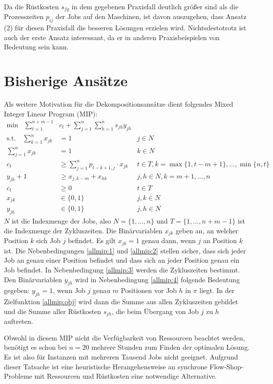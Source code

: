 \documentclass{scrreprt}
\begin{document}
Da die Rüstkosten $s_{fg}$ in dem gegebenen Praxisfall deutlich größer sind als die Prozesszeiten $p_{ij}$ der Jobs auf den Maschinen,
ist davon auszugehen, dass Ansatz (2) für diesen Praxisfall die besseren Lösungen erzielen wird.
Nichtsdestotrotz ist auch der erste Ansatz interessant, da er in anderen Praxisbeispielen von Bedeutung sein kann.


\section{Bisherige Ansätze}
\label{sec:bisherigeAnsaetze}
Als weitere Motivation für die Dekompositionsansätze dient folgendes Mixed Integer Linear Program (MIP):
\begin{align}
    \text{min} \quad \sum_{t=1}^{n+m-1} &c_t + \sum_{j=1}^n \sum_{h=1}^n s_{jh} y_{jh} \label{allmip:obj}\\
    \text{s.t.}\quad \sum_{k=1}^n x_{jk} &= 1 & j\in N \label{allmip:1}\\
                     \sum_{j=1}^n x_{jk} &= 1 & k\in N \label{allmip:2}\\
    c_t &\geq \sum_{j=1}^n p_{t-k+1,j} \cdot x_{jk} & t\in T, k=\max\{1,t-m+1\},\ldots,\min\{n,t\} \label{allmip:3}\\
    y_{jh} + 1 &\geq x_{j,k-m} + x_{hk} & j,h\in N, k=m+1,\ldots,n \label{allmip:4}\\
    c_t &\geq 0 & t\in T \\
    x_{jk} &\in \{0,1\} & j,k\in N \\
    y_{jh} &\in \{0,1\} & j,h\in N
\end{align}
$N$ ist die Indexmenge der Jobs, also $N=\{1,\ldots,n\}$ und $T=\{1,\ldots,n+m-1\}$ ist die Indexmenge der Zykluszeiten.
Die Binärvariablen $x_{jk}$ geben an, an welcher Position $k$
sich Job $j$ befindet. Es gilt $x_{jk}=1$ genau dann, wenn $j$ an
Position $k$ ist. Die Nebenbedingungen \ref{allmip:1} und \ref{allmip:2}
stellen sicher, dass sich jeder Job an genau einer Position befindet und 
dass sich an jeder Position genau ein Job befindet.
In Nebenbedingung \ref{allmip:3} werden die Zykluszeiten bestimmt.
Den Binärvariablen $y_{jh}$ wird in Nebenbedingung \ref{allmip:4} folgende
Bedeutung gegeben: $y_{jh}=1$, wenn Job $j$ genau $m$ Positionen
vor Job $h$ in $\pi$ liegt.
In der Zielfunktion \ref{allmip:obj} wird dann die Summe aus allen
Zykluszeiten gebildet und die Summe aller Rüstkosten $s_{jh}$, die beim
Übergang von Job $j$ zu $h$ auftreten.

Obwohl in diesem MIP nicht die Verfügbarkeit von Ressourcen beachtet werden,
benötigt es schon bei $n=20$ mehrere Stunden zum Finden der optimalen Lösung.
Es ist also für Instanzen mit mehreren Tausend Jobs nicht geeignet.
Aufgrund dieser Tatsache ist eine heuristische Herangehensweise an 
synchrone Flow-Shop-Probleme mit Ressourcen und Rüstkosten eine notwendige Alternative.
\end{document}
